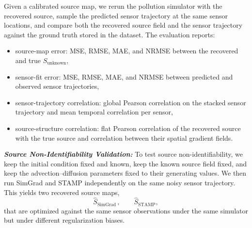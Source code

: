 Given a calibrated source map, we rerun the pollution simulator with the recovered source, sample the predicted sensor trajectory at the same sensor locations, and compare both the recovered source field and the sensor trajectory against the ground truth stored in the dataset. The evaluation reports:
\begin{itemize}[itemsep=0pt,topsep=0pt,leftmargin=*]
    \item source-map error: MSE, RMSE, MAE, and NRMSE between the recovered and true $S_{\mathrm{unknown}}$,
    \item sensor-fit error: MSE, RMSE, MAE, and NRMSE between predicted and observed sensor trajectories,
    \item sensor-trajectory correlation: global Pearson correlation on the stacked sensor trajectory and mean temporal correlation per sensor,
    \item source-structure correlation: flat Pearson correlation of the recovered source with the true source and correlation between their spatial gradient fields.
\end{itemize}


\textit{\textbf{Source Non-Identifiability Validation:}} To test source non-identifiability, we keep the initial condition fixed and known, keep the known source field fixed, and keep the advection--diffusion parameters fixed to their generating values. We then run SimGrad and STAMP independently on the same noisy sensor trajectory. This yields two recovered source maps,
\begin{equation}
\widehat{S}_{\mathrm{SimGrad}} \, , \qquad \widehat{S}_{\mathrm{STAMP}}, \nonumber
\end{equation}
that are optimized against the same sensor observations under the same simulator but under different regularization biases.

